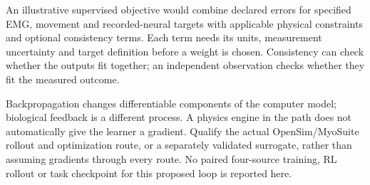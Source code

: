 An illustrative supervised objective would combine declared errors for
specified EMG, movement and recorded-neural targets with applicable physical
constraints and optional consistency terms. Each term needs its units,
measurement uncertainty and target definition before a weight is chosen.
Consistency can check whether the outputs fit together; an independent
observation checks whether they fit the measured outcome.

Backpropagation changes differentiable components of the computer model;
biological feedback is a different process. A physics engine in the path does
not automatically give the learner a gradient. Qualify the actual
OpenSim/MyoSuite rollout and optimization route, or a separately validated
surrogate, rather than assuming gradients through every route. No paired four-source training,
RL rollout or task checkpoint for this proposed loop is reported here.

